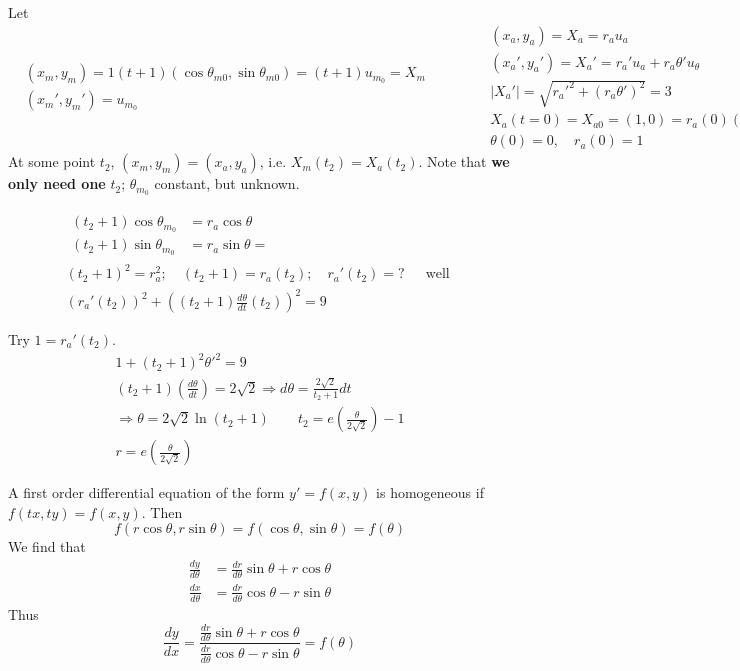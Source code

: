 \documentclass[twoside]{amsart}
\theoremstyle{plain}
\theoremstyle{definition}
\newcommand{\exercisehead}[1]
  {\smallskip
   \noindent{\small\bf Exercise #1.}}
\begin{document}
Let
\[
  \begin{aligned}
    & (x_m,y_m) = 1(t+1)(\cos{\theta_{m0}},\sin{\theta_{m0}}) = (t+1)u_{m_0} = X_m \\
    & (x_m',y_m')=u_{m_0} 
  \end{aligned}
  \quad \quad \quad 
\begin{aligned}
  & (x_a,y_a) = X_a = r_a u_a \\
  & (x_a',y_a') = X_a' = r_a'u_a + r_a \theta' u_{\theta} \\
  & |X_a'| = \sqrt{ r_a'^2 + (r_a \theta')^2 } = 3 \\
  & X_a(t=0) = X_{a0} = (1,0) = r_a(0) (\cos{\theta(0)},\sin{\theta(0)} ) \\
  & \theta(0) =0, \quad r_a(0) = 1
\end{aligned} 
\]
At some point $t_2$, $(x_m,y_m) = (x_a,y_a)$, i.e. $X_m(t_2) = X_a(t_2)$.  Note that \textbf{ we only need one } $t_2$; $\theta_{m_0}$ constant, but unknown.  

\[
\begin{gathered}
  \begin{aligned}
    (t_2 + 1) \cos{\theta_{m_0}} & = r_a \cos{\theta} \\
    (t_2 + 1) \sin{\theta_{m_0}} & = r_a \sin{\theta} =
  \end{aligned} \\
  (t_2 + 1)^2 = r_a^2; \quad (t_2+1) = r_a(t_2); \quad r_a'(t_2) = ? \quad \, \text{ well } \\
  (r_a'(t_2))^2 + ((t_2+1)\frac{d\theta}{dt}(t_2) )^2  = 9 
\end{gathered}
\]

Try $1 = r_a'(t_2)$.  
\[
\begin{gathered}
  1 + (t_2 + 1)^2 \theta'^2 = 9 \\
  (t_2+1)\left( \frac{d\theta}{dt} \right) = 2\sqrt{2} \Longrightarrow d\theta = \frac{2\sqrt{2}}{ t_2 + 1 } dt \\
  \Longrightarrow \boxed{ \theta = 2\sqrt{2} \ln{ (t_2 + 1 ) } } \quad \quad t_2 = e\left( \frac{ \theta}{2 \sqrt{2} } \right) -1 \\
  \boxed{ r = e\left( \frac{\theta}{2\sqrt{2}} \right) }
\end{gathered}
\]

\exercisehead{17}

A first order differential equation of the form $y' = f(x,y)$ is homogeneous if $f(tx,ty)=f(x,y)$.  Then 
\[
f(r \cos{\theta}, r\sin{\theta}) = f(\cos{\theta}, \sin{\theta}) = f(\theta) 
\]
We find that
\[
\begin{aligned}
  \frac{dy}{d\theta} & = \frac{dr}{d\theta} \sin{\theta} + r \cos{\theta} \\
  \frac{dx}{d\theta} & = \frac{dr}{d\theta} \cos{\theta} - r \sin{\theta}
\end{aligned}
\]
Thus
\[
\frac{dy}{dx} = \frac{ \frac{dr}{d\theta} \sin{\theta} + r \cos{\theta} }{ \frac{dr}{d\theta} \cos{\theta} - r \sin{\theta} } = f(\theta)
\]
\end{document}
